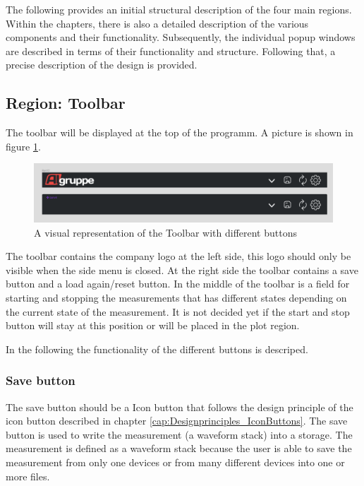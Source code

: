 \documentclass{scrreprt}
\begin{document}
The following provides an initial structural description of the four main regions. Within the chapters, there is also a detailed description of the various components and their functionality. Subsequently, the individual popup windows are described in terms of their functionality and structure. Following that, a precise description of the design is provided.

\subsection{Region: Toolbar}

The toolbar will be displayed at the top of the programm. 
A picture is shown in figure \ref{fig: toolbar}. 
\begin{figure}
    \includegraphics[width=.9\textwidth]{assets/pictures/Toolbar states.png}
    \caption[]{A visual representation of the Toolbar with different buttons}
    \label{fig: toolbar}
\end{figure}
The toolbar contains the company logo at the left side, this logo should only be visible when the side menu is closed. 
At the right side the toolbar contains a save button and a load again/reset button. 
In the middle of the toolbar is a field for starting and stopping the measurements that has different states depending on the current state of the measurement. It is not decided yet if the start and stop button will stay at this position or will be placed in the plot region. 

In the following the functionality of the different buttons is descriped. 

\subsubsection{Save button}

The save button should be a Icon button that follows the design principle of the icon button described in chapter \ref{cap:Designprinciples_IconButtons}. 
The save button is used to write the measurement (a waveform stack) into a storage. 
The measurement is defined as a waveform stack because the user is able to save the measurement from only one devices or from many different devices into one or more files.
\end{document}
